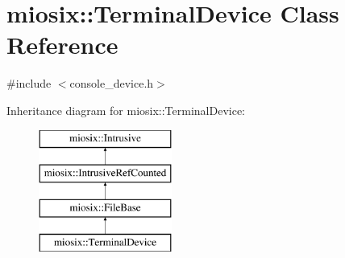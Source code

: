 \hypertarget{classmiosix_1_1_terminal_device}{\section{miosix\-:\-:Terminal\-Device Class Reference}
\label{classmiosix_1_1_terminal_device}
}


{\ttfamily \#include $<$console\-\_\-device.\-h$>$}

Inheritance diagram for miosix\-:\-:Terminal\-Device\-:\begin{figure}[H]
\begin{center}
\leavevmode
\includegraphics[height=4.000000cm]{classmiosix_1_1_terminal_device}
\end{center}
\end{figure}
